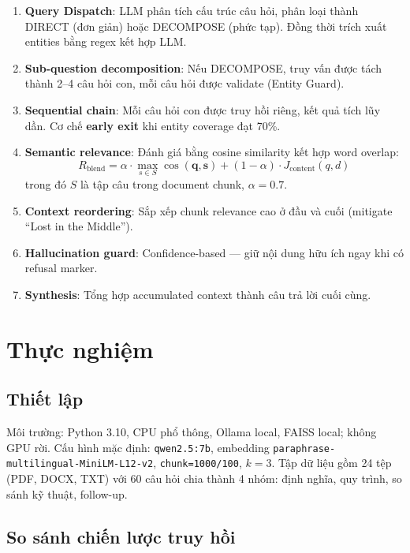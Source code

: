 \documentclass[10pt, conference, a4paper, compsocconf]{IEEEtran}
\begin{document}
\begin{enumerate}
\item \textbf{Query Dispatch}: LLM phân tích cấu trúc câu hỏi, phân loại thành DIRECT (đơn giản) hoặc DECOMPOSE (phức tạp). Đồng thời trích xuất entities bằng regex kết hợp LLM.
\item \textbf{Sub-question decomposition}: Nếu DECOMPOSE, truy vấn được tách thành 2--4 câu hỏi con, mỗi câu hỏi được validate (Entity Guard).
\item \textbf{Sequential chain}: Mỗi câu hỏi con được truy hồi riêng, kết quả tích lũy dần. Cơ chế \textbf{early exit} khi entity coverage đạt 70\%.
\item \textbf{Semantic relevance}: Đánh giá bằng cosine similarity kết hợp word overlap:
\begin{equation}
R_{\mathrm{blend}} = \alpha \cdot \max_{s \in S}\cos(\mathbf{q}, \mathbf{s}) + (1-\alpha) \cdot J_{\mathrm{content}}(q, d)
\end{equation}
trong đó $S$ là tập câu trong document chunk, $\alpha = 0.7$.
\item \textbf{Context reordering}: Sắp xếp chunk relevance cao ở đầu và cuối (mitigate ``Lost in the Middle'').
\item \textbf{Hallucination guard}: Confidence-based --- giữ nội dung hữu ích ngay khi có refusal marker.
\item \textbf{Synthesis}: Tổng hợp accumulated context thành câu trả lời cuối cùng.
\end{enumerate}

\section{Thực nghiệm}

\subsection{Thiết lập}

Môi trường: Python 3.10, CPU phổ thông, Ollama local, FAISS local; không GPU rời. Cấu hình mặc định: \texttt{qwen2.5:7b}, embedding \texttt{paraphrase-multilingual-MiniLM-L12-v2}, \texttt{chunk=1000/100}, $k=3$. Tập dữ liệu gồm 24 tệp (PDF, DOCX, TXT) với 60 câu hỏi chia thành 4 nhóm: định nghĩa, quy trình, so sánh kỹ thuật, follow-up.

\subsection{So sánh chiến lược truy hồi}
\end{document}
